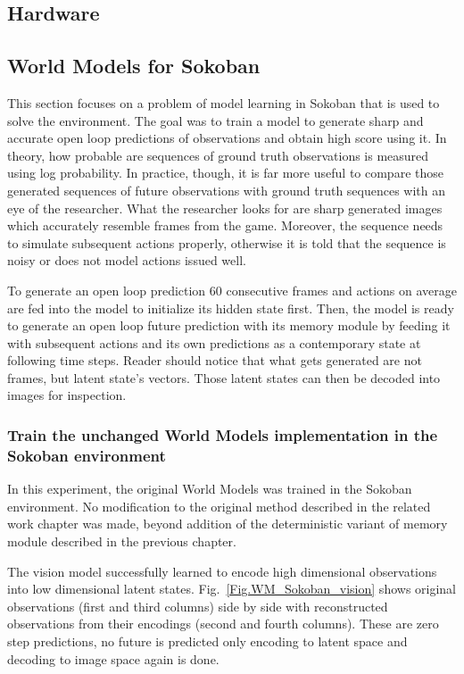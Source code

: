 \subsection{Hardware}


\subsection{World Models for Sokoban}

This section focuses on a problem of model learning in Sokoban that is used to solve the environment. The goal was to train a model to generate sharp and accurate open loop predictions of observations and obtain high score using it. In theory, how probable are sequences of ground truth observations is measured using log probability. In practice, though, it is far more useful to compare those generated sequences of future observations with ground truth sequences with an eye of the researcher. What the researcher looks for are sharp generated images which accurately resemble frames from the game. Moreover, the sequence needs to simulate subsequent actions properly, otherwise it is told that the sequence is noisy or does not model actions issued well.

To generate an open loop prediction 60 consecutive frames and actions on average are fed into the model to initialize its hidden state first. Then, the model is ready to generate an open loop future prediction with its memory module by feeding it with subsequent actions and its own predictions as a contemporary state at following time steps. Reader should notice that what gets generated are not frames, but latent state's vectors. Those latent states can then be decoded into images for inspection.

\subsubsection{Train the unchanged World Models implementation in the Sokoban environment}

In this experiment, the original World Models was trained in the Sokoban environment. No modification to the original method described in the related work chapter was made, beyond addition of the deterministic variant of memory module described in the previous chapter.

The vision model successfully learned to encode high dimensional observations into low dimensional latent states. Fig.~\ref{Fig.WM_Sokoban_vision} shows original observations (first and third columns) side by side with reconstructed observations from their encodings (second and fourth columns). These are zero step predictions, no future is predicted only encoding to latent space and decoding to image space again is done.

